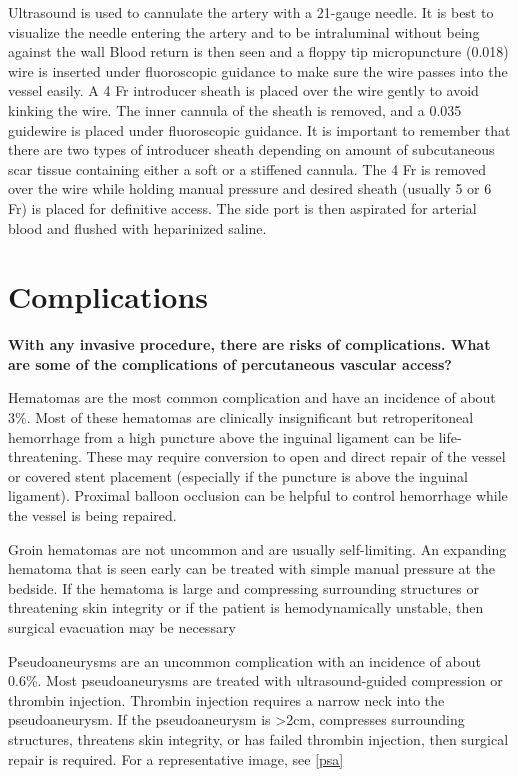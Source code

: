 \documentclass[
]{book}
\begin{document}
Ultrasound is used to cannulate the artery with a 21-gauge needle. It is
best to visualize the needle entering the artery and to be intraluminal
without being against the wall Blood return is then seen and a floppy
tip micropuncture (0.018) wire is inserted under fluoroscopic guidance
to make sure the wire passes into the vessel easily. A 4 Fr introducer
sheath is placed over the wire gently to avoid kinking the wire. The
inner cannula of the sheath is removed, and a 0.035 guidewire is placed
under fluoroscopic guidance. It is important to remember that there are
two types of introducer sheath depending on amount of subcutaneous scar
tissue containing either a soft or a stiffened cannula. The 4 Fr is
removed over the wire while holding manual pressure and desired sheath
(usually 5 or 6 Fr) is placed for definitive access. The side port is
then aspirated for arterial blood and flushed with heparinized saline.

\hypertarget{access-comp}{%
\section{Complications}\label{access-comp}}

\textbf{With any invasive procedure, there are risks of complications. What
are some of the complications of percutaneous vascular access?}

Hematomas are the most common complication and have an incidence of
about 3\%. Most of these hematomas are clinically insignificant but
retroperitoneal hemorrhage from a high puncture above the inguinal
ligament can be life-threatening. These may require conversion to open
and direct repair of the vessel or covered stent placement (especially
if the puncture is above the inguinal ligament). Proximal balloon
occlusion can be helpful to control hemorrhage while the vessel is being
repaired.

Groin hematomas are not uncommon and are usually self-limiting. An
expanding hematoma that is seen early can be treated with simple manual
pressure at the bedside. If the hematoma is large and compressing
surrounding structures or threatening skin integrity or if the patient
is hemodynamically unstable, then surgical evacuation may be necessary

Pseudoaneurysms are an uncommon complication with an incidence of about
0.6\%. Most pseudoaneurysms are treated with ultrasound-guided
compression or thrombin injection. Thrombin injection requires a narrow
neck into the pseudoaneurysm. If the pseudoaneurysm is \textgreater2cm, compresses
surrounding structures, threatens skin integrity, or has failed thrombin
injection, then surgical repair is required.\citep{morgan2003, stone2014}
For a representative image, see \ref{psa}
\end{document}
